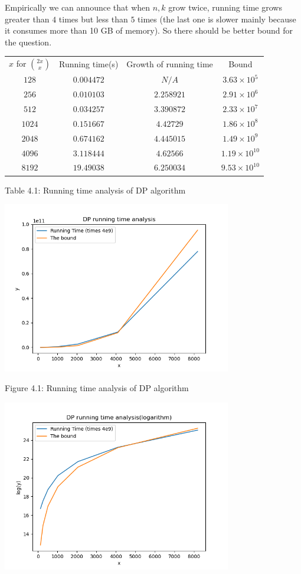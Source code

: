 \documentclass[11pt,a4paper,oneside]{article}
\begin{document}
\begin{problem}{4}
	Empirically we can announce that when $n, k$ grow twice, running time grows greater than $4$ times but less than $5$ times (the last one is slower mainly because it consumes more than 10 GB of memory). So there should be better bound for the question.
\begin{table}[htbp]
	\centering
	  \begin{tabular}{cccc}
	  $x$ for ${2x \choose x}$ &    Running time(s) & Growth of running time   & Bound \\
	  $128$&$0.004472$&$N/A$&$3.63 \times 10^{ 5 }$\\
$256$&$0.010103$&$2.258921$&$2.91 \times 10^{ 6 }$\\
$512$&$0.034257$&$3.390872$&$2.33 \times 10^{ 7 }$\\
$1024$&$0.151667$&$4.42729$&$1.86 \times 10^{ 8 }$\\
$2048$&$0.674162$&$4.445015$&$1.49 \times 10^{ 9 }$\\
$4096$&$3.118444$&$4.62566$&$1.19 \times 10^{ 10 }$\\
$8192$&$19.49038$&$6.250034$&$9.53 \times 10^{ 10 }$\\
	  \end{tabular}%
	\par\scriptsize Table 4.1: Running time analysis of DP algorithm
  \end{table}%
  \begin{center}
	\includegraphics[width=100mm]{Figure_3.png}\scriptsize\par
	Figure 4.1: Running time analysis of DP algorithm
	\end{center}
	\begin{center}
	\includegraphics[width=100mm]{Figure_4.png}\scriptsize\par

\end{center}
\end{problem}
\end{document}

